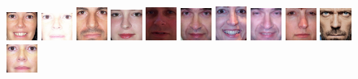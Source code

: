 \begin{figure}[H]
\includegraphics[width=0.09\textwidth]{img/fdResult1/output65.png}
\includegraphics[width=0.09\textwidth]{img/fdResult1/output66.png}
\includegraphics[width=0.09\textwidth]{img/fdResult1/output68.png}
\includegraphics[width=0.09\textwidth]{img/fdResult1/output70.png}
\includegraphics[width=0.09\textwidth]{img/fdResult1/output71.png}
\includegraphics[width=0.09\textwidth]{img/fdResult1/output75.png}
\includegraphics[width=0.09\textwidth]{img/fdResult1/output76.png}
\includegraphics[width=0.09\textwidth]{img/fdResult1/output77.png}
\includegraphics[width=0.09\textwidth]{img/fdResult1/output80.png}
\includegraphics[width=0.09\textwidth]{img/fdResult2/output9.png}
\includegraphics[width=0.09\textwidth]{img/fdResult1/output83.png}

\end{figure}

